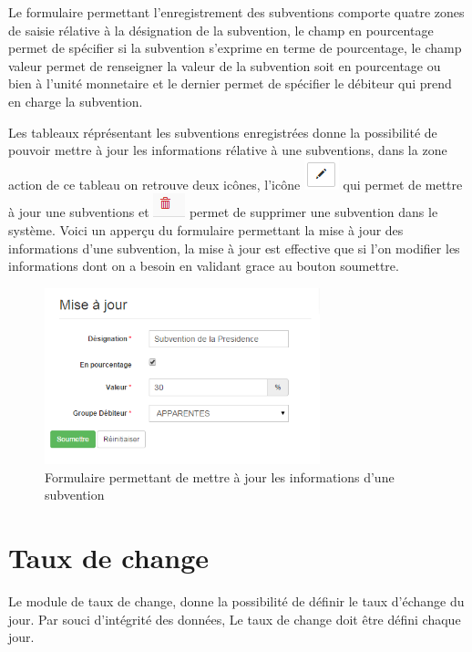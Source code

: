 \documentclass[12pt,a4paper]{report}
\begin{document}
Le formulaire permettant l'enregistrement des subventions comporte quatre zones de saisie rélative à la désignation de la subvention, le champ en pourcentage permet de spécifier si la subvention s'exprime en terme  de pourcentage, le champ valeur permet de renseigner la valeur de la subvention soit en pourcentage ou bien à l'unité monnetaire et le dernier permet de spécifier le débiteur qui prend en charge la subvention. 

Les tableaux réprésentant les subventions enregistrées donne la possibilité de pouvoir mettre à jour les informations rélative à une subventions, dans la zone action de ce tableau on retrouve deux icônes, l'icône \includegraphics[scale=0.7]{pic/EditBlack.png} qui permet de mettre à jour une subventions et \includegraphics[scale=0.7]{pic/DeleteWRed.png} permet de supprimer une subvention dans le système.
Voici un apperçu du formulaire permettant la mise à jour des informations d'une subvention, la mise à jour est effective que si l'on modifier les informations dont on a besoin en validant grace au bouton soumettre. 

\begin{figure}[h]
\begin{center}
\includegraphics[width=8cm]{pic/FormUpSubventions.png}
\end{center}
\caption{Formulaire permettant de mettre à jour les informations d'une subvention}
\label{Formulaire permettant de mettre à jour les informations d'une subvention}
\end{figure} 


\newpage
\section{Taux de change}
Le module de taux de change, donne la possibilité de définir le taux d'échange du jour. Par souci d'intégrité des données, Le taux de change doit être défini chaque jour.
\end{document}
